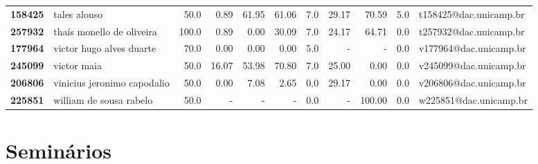 \documentclass[11pt]{article}
\begin{document}
\begin{center}
\begin{landscape}
\begin{longtable}{llrrrrrrrrl}
\textbf{158425} &                           tales alonso &                  50.0 &        0.89 &       61.95 &       61.06 &                      7.0 &       29.17 &       70.59 &                        5.0 &  t158425@dac.unicamp.br \\
\textbf{257932} &              thaís monello de oliveira &                 100.0 &        0.89 &        0.00 &       30.09 &                      7.0 &       24.17 &       64.71 &                        0.0 &  t257932@dac.unicamp.br \\
\textbf{177964} &               victor hugo alves duarte &                  70.0 &        0.00 &        0.00 &        0.00 &                      5.0 &           - &           - &                        0.0 &  v177964@dac.unicamp.br \\
\textbf{245099} &                            victor maia &                  50.0 &       16.07 &       53.98 &       70.80 &                      7.0 &       25.00 &        0.00 &                        0.0 &  v245099@dac.unicamp.br \\
\textbf{206806} &            vinicius jeronimo capodalio &                  50.0 &        0.00 &        7.08 &        2.65 &                      0.0 &       29.17 &        0.00 &                        0.0 &  v206806@dac.unicamp.br \\
\textbf{225851} &                william de sousa rabelo &                  50.0 &           - &           - &           - &                      0.0 &           - &      100.00 &                        0.0 &  w225851@dac.unicamp.br \\
\end{longtable}
\end{landscape}\end{center}


\section{Seminários}
\label{sec:orgd54b7cd}
\end{document}
